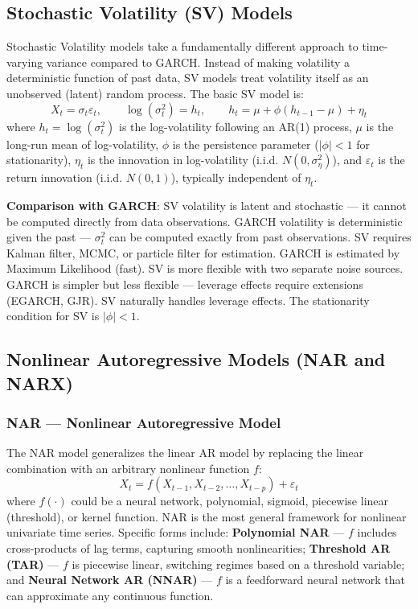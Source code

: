 \documentclass[11pt,a4paper]{article}
\begin{document}
\subsection{Stochastic Volatility (SV) Models}

Stochastic Volatility models take a fundamentally different approach to time-varying variance compared to GARCH. Instead of making volatility a deterministic function of past data, SV models treat volatility itself as an unobserved (latent) random process. The basic SV model is:
\[
X_t = \sigma_t \varepsilon_t, \qquad \log(\sigma_t^2) = h_t, \qquad h_t = \mu + \phi(h_{t-1} - \mu) + \eta_t
\]
where $h_t = \log(\sigma_t^2)$ is the log-volatility following an AR(1) process, $\mu$ is the long-run mean of log-volatility, $\phi$ is the persistence parameter ($|\phi| < 1$ for stationarity), $\eta_t$ is the innovation in log-volatility (i.i.d. $N(0, \sigma_\eta^2)$), and $\varepsilon_t$ is the return innovation (i.i.d. $N(0,1)$), typically independent of $\eta_t$.

\textbf{Comparison with GARCH}: SV volatility is latent and stochastic --- it cannot be computed directly from data observations. GARCH volatility is deterministic given the past --- $\sigma_t^2$ can be computed exactly from past observations. SV requires Kalman filter, MCMC, or particle filter for estimation. GARCH is estimated by Maximum Likelihood (fast). SV is more flexible with two separate noise sources. GARCH is simpler but less flexible --- leverage effects require extensions (EGARCH, GJR). SV naturally handles leverage effects. The stationarity condition for SV is $|\phi| < 1$.

\subsection{Nonlinear Autoregressive Models (NAR and NARX)}

\subsubsection{NAR --- Nonlinear Autoregressive Model}

The NAR model generalizes the linear AR model by replacing the linear combination with an arbitrary nonlinear function $f$:
\[
X_t = f(X_{t-1}, X_{t-2}, \ldots, X_{t-p}) + \varepsilon_t
\]
where $f(\cdot)$ could be a neural network, polynomial, sigmoid, piecewise linear (threshold), or kernel function. NAR is the most general framework for nonlinear univariate time series. Specific forms include: \textbf{Polynomial NAR} --- $f$ includes cross-products of lag terms, capturing smooth nonlinearities; \textbf{Threshold AR (TAR)} --- $f$ is piecewise linear, switching regimes based on a threshold variable; and \textbf{Neural Network AR (NNAR)} --- $f$ is a feedforward neural network that can approximate any continuous function.
\end{document}
